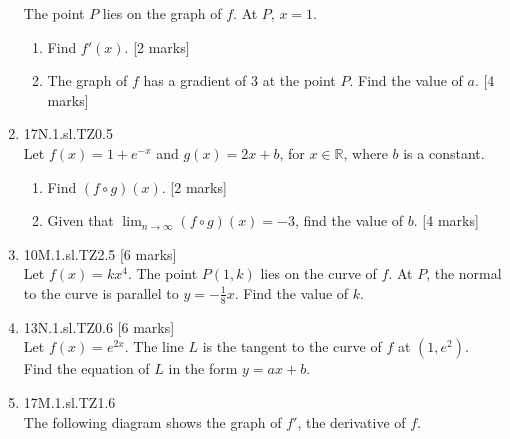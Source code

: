 \documentclass[12pt, twoside]{article}
\begin{document}
\begin{enumerate}
    The point $P$ lies on the graph of $f$. At $P$, $x=1$.
    \begin{enumerate}
      \item Find $f'(x)$. [2 marks]
      \item The graph of $f$ has a gradient of 3 at the point $P$. Find the value of $a$. [4 marks]
    \end{enumerate}

  \item 17N.1.sl.TZ0.5\\
  Let $f(x)=1+e^{-x}$ and $g(x)=2x+b$, for $x \in \mathbb{R}$, where $b$ is a constant.
  \begin{enumerate}
    \item Find $(f \circ g)(x)$. [2 marks]
    \item Given that $\displaystyle \lim_{n \rightarrow \infty} (f \circ g)(x) = -3$, find the value of $b$. [4 marks]
  \end{enumerate}

  \item 10M.1.sl.TZ2.5 [6 marks]\\
  Let $f(x)=kx^4$. The point $P(1,k)$ lies on the curve of $f$. At $P$, the normal to the curve is parallel to $y=- \frac{1}{8} x$. Find the value of $k$.

  \item 13N.1.sl.TZ0.6 [6 marks]\\
  Let $f(x)=e^{2x}$. The line $L$ is the tangent to the curve of $f$ at $(1,e^2)$.\\
  Find the equation of $L$ in the form $y=ax+b$.

  \item 17M.1.sl.TZ1.6\\
  The following diagram shows the graph of $f'$, the derivative of $f$.
    \begin{center}
    \end{center}


\end{enumerate}
\end{document}
